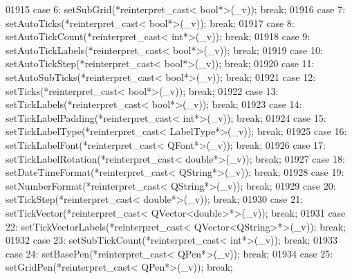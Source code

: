 \begin{DoxyCode}
01915         \textcolor{keywordflow}{case} 6: setSubGrid(*reinterpret\_cast< bool*>(\_v)); \textcolor{keywordflow}{break};
01916         \textcolor{keywordflow}{case} 7: setAutoTicks(*reinterpret\_cast< bool*>(\_v)); \textcolor{keywordflow}{break};
01917         \textcolor{keywordflow}{case} 8: setAutoTickCount(*reinterpret\_cast< int*>(\_v)); \textcolor{keywordflow}{break};
01918         \textcolor{keywordflow}{case} 9: setAutoTickLabels(*reinterpret\_cast< bool*>(\_v)); \textcolor{keywordflow}{break};
01919         \textcolor{keywordflow}{case} 10: setAutoTickStep(*reinterpret\_cast< bool*>(\_v)); \textcolor{keywordflow}{break};
01920         \textcolor{keywordflow}{case} 11: setAutoSubTicks(*reinterpret\_cast< bool*>(\_v)); \textcolor{keywordflow}{break};
01921         \textcolor{keywordflow}{case} 12: setTicks(*reinterpret\_cast< bool*>(\_v)); \textcolor{keywordflow}{break};
01922         \textcolor{keywordflow}{case} 13: setTickLabels(*reinterpret\_cast< bool*>(\_v)); \textcolor{keywordflow}{break};
01923         \textcolor{keywordflow}{case} 14: setTickLabelPadding(*reinterpret\_cast< int*>(\_v)); \textcolor{keywordflow}{break};
01924         \textcolor{keywordflow}{case} 15: setTickLabelType(*reinterpret\_cast< LabelType*>(\_v)); \textcolor{keywordflow}{break};
01925         \textcolor{keywordflow}{case} 16: setTickLabelFont(*reinterpret\_cast< QFont*>(\_v)); \textcolor{keywordflow}{break};
01926         \textcolor{keywordflow}{case} 17: setTickLabelRotation(*reinterpret\_cast< double*>(\_v)); \textcolor{keywordflow}{break};
01927         \textcolor{keywordflow}{case} 18: setDateTimeFormat(*reinterpret\_cast< QString*>(\_v)); \textcolor{keywordflow}{break};
01928         \textcolor{keywordflow}{case} 19: setNumberFormat(*reinterpret\_cast< QString*>(\_v)); \textcolor{keywordflow}{break};
01929         \textcolor{keywordflow}{case} 20: setTickStep(*reinterpret\_cast< double*>(\_v)); \textcolor{keywordflow}{break};
01930         \textcolor{keywordflow}{case} 21: setTickVector(*\textcolor{keyword}{reinterpret\_cast<} QVector<double>*\textcolor{keyword}{>}(\_v)); \textcolor{keywordflow}{break};
01931         \textcolor{keywordflow}{case} 22: setTickVectorLabels(*\textcolor{keyword}{reinterpret\_cast<} QVector<QString>*\textcolor{keyword}{>}(\_v)); \textcolor{keywordflow}{break};
01932         \textcolor{keywordflow}{case} 23: setSubTickCount(*reinterpret\_cast< int*>(\_v)); \textcolor{keywordflow}{break};
01933         \textcolor{keywordflow}{case} 24: setBasePen(*reinterpret\_cast< QPen*>(\_v)); \textcolor{keywordflow}{break};
01934         \textcolor{keywordflow}{case} 25: setGridPen(*reinterpret\_cast< QPen*>(\_v)); \textcolor{keywordflow}{break};

\end{DoxyCode}
